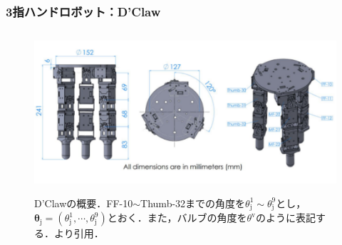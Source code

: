 \documentclass[dvipdfmx]{ampbt_nomag}
\begin{document}
\subsubsection{3指ハンドロボット：D'Claw}
\begin{figure}[hbtp]
  \centering
  \includegraphics[height=6cm]
       {asset/img/dclaw.pdf}
  \caption{D'Clawの概要．FF-10$\sim$Thumb-32までの角度を$\theta^1_{\textrm{j}}\sim\theta^9_{\textrm{j}}$とし，$\boldsymbol{\theta}_{\textrm{j}}=(\theta^1_{\textrm{j}},\cdots,\theta^9_{\textrm{j}})$とおく．また，バルブの角度を$\theta^{\textrm{v}}$のように表記する．\cite{ahn2020robel}より引用．}
  \label{dclaw_structure}
\end{figure}
 
\end{document}
